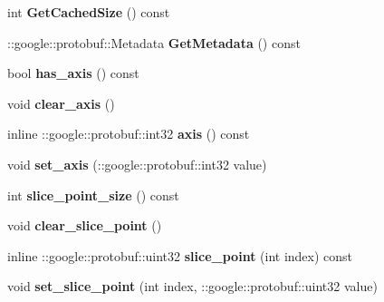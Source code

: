 \begin{DoxyCompactItemize}
int {\bfseries Get\+Cached\+Size} () const
\item 
\mbox{\label{classcaffe_1_1_slice_parameter_a9f27c03ce586bfe2bb65047d1ef7f5c4}} 
\+::google\+::protobuf\+::\+Metadata {\bfseries Get\+Metadata} () const
\item 
\mbox{\label{classcaffe_1_1_slice_parameter_aaf0d6bcd0415ff2791415aaae0f3e55d}} 
bool {\bfseries has\+\_\+axis} () const
\item 
\mbox{\label{classcaffe_1_1_slice_parameter_a76b159d539afca6a392d75110a5a6e3e}} 
void {\bfseries clear\+\_\+axis} ()
\item 
\mbox{\label{classcaffe_1_1_slice_parameter_acc847774d02a263f5e98e3e15eda1408}} 
inline \+::google\+::protobuf\+::int32 {\bfseries axis} () const
\item 
\mbox{\label{classcaffe_1_1_slice_parameter_a3dbc39ce3ac89eba830b52378ed45626}} 
void {\bfseries set\+\_\+axis} (\+::google\+::protobuf\+::int32 value)
\item 
\mbox{\label{classcaffe_1_1_slice_parameter_a62ee5b4ee3d37a69ccbed1c1c90249fd}} 
int {\bfseries slice\+\_\+point\+\_\+size} () const
\item 
\mbox{\label{classcaffe_1_1_slice_parameter_af0b3d8820f3a958d0d29b75148c688f9}} 
void {\bfseries clear\+\_\+slice\+\_\+point} ()
\item 
\mbox{\label{classcaffe_1_1_slice_parameter_ae021a52acd6adb3c2444de328642bfe7}} 
inline \+::google\+::protobuf\+::uint32 {\bfseries slice\+\_\+point} (int index) const
\item 
\mbox{\label{classcaffe_1_1_slice_parameter_aeabaa762cd7fdd41a8be814f5374b3e3}} 
void {\bfseries set\+\_\+slice\+\_\+point} (int index, \+::google\+::protobuf\+::uint32 value)
\item 
\mbox{\label{classcaffe_1_1_slice_parameter_ad95cf2a181dec985fb848d00a1578dcd}} 

\end{DoxyCompactItemize}
